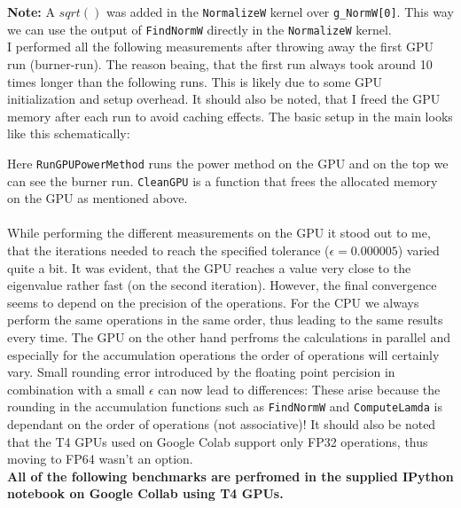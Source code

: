 \textbf{Note:} A $sqrt()$ was added in the \texttt{NormalizeW} kernel over \texttt{g\_NormW[0]}. This way we can use the output of \texttt{FindNormW} directly in the \texttt{NormalizeW} kernel.\\


I performed all the following measurements after throwing away the first GPU run (burner-run). The reason beaing, that the first run always took around 10 times longer than the following runs. This is likely due to some GPU initialization and setup overhead. It should also be noted, that I freed the GPU memory after each run to avoid caching effects. The basic setup in the main looks like this schematically: 

Here \texttt{RunGPUPowerMethod} runs the power method on the GPU and on the top we can see the burner run. \texttt{CleanGPU} is a function that frees the allocated memory on the GPU as mentioned above.\\

\\
While performing the different measurements on the GPU it stood out to me, that the iterations needed to reach the specified tolerance ($\epsilon = 0.000005$) varied quite a bit. It was evident, that the GPU reaches a value very close to the eigenvalue rather fast (on the second iteration). However, the final convergence seems to depend on the precision of the operations. For the CPU we always perform the same operations in the same order, thus leading to the same results every time. The GPU on the other hand perfroms the calculations in parallel and especially for the accumulation operations the order of operations will certainly vary. Small rounding error introduced by the floating point percision in combination with a small $\epsilon$ can now lead to differences: These arise because the rounding in the accumulation functions such as \texttt{FindNormW} and \texttt{ComputeLamda} is dependant on the order of operations (not associative)! It should also be noted that the T4 GPUs used on Google Colab support only FP32 operations, thus moving to FP64 wasn't an option. \\

\textbf{All of the following benchmarks are perfromed in the supplied IPython notebook on Google Collab using T4 GPUs.}\\ 

